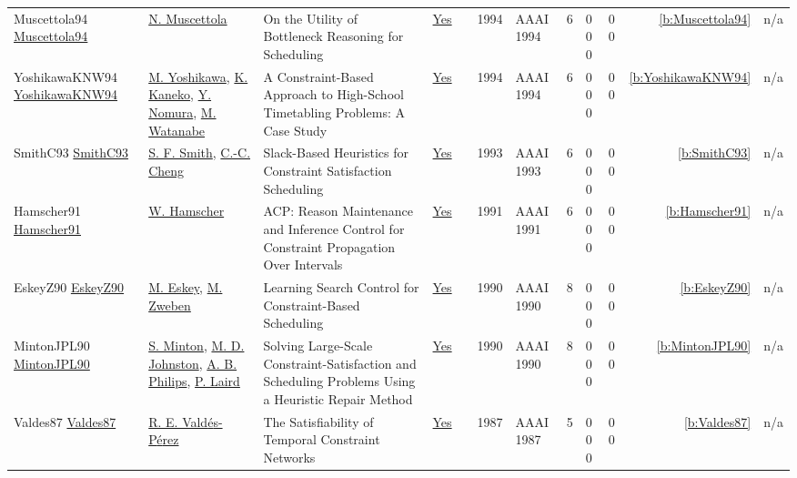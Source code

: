 {\begin{longtable}{>{\raggedright\arraybackslash}p{3cm}>{\raggedright\arraybackslash}p{4.5cm}>{\raggedright\arraybackslash}p{6.0cm}rrrp{2.5cm}rp{1cm}p{1cm}rr}
Muscettola94 \href{http://www.aaai.org/Library/AAAI/1994/aaai94-170.php}{Muscettola94} & \hyperref[auth:a289]{N. Muscettola} & On the Utility of Bottleneck Reasoning for Scheduling & \href{../works/Muscettola94.pdf}{Yes} & \cite{Muscettola94} & 1994 & AAAI 1994 & 6 & 0 0 0 & 0 0 & \ref{b:Muscettola94} & n/a\\
YoshikawaKNW94 \href{http://www.aaai.org/Library/AAAI/1994/aaai94-171.php}{YoshikawaKNW94} & \hyperref[auth:a1280]{M. Yoshikawa}, \hyperref[auth:a1281]{K. Kaneko}, \hyperref[auth:a1282]{Y. Nomura}, \hyperref[auth:a1283]{M. Watanabe} & A Constraint-Based Approach to High-School Timetabling Problems: {A} Case Study & \href{../works/YoshikawaKNW94.pdf}{Yes} & \cite{YoshikawaKNW94} & 1994 & AAAI 1994 & 6 & 0 0 0 & 0 0 & \ref{b:YoshikawaKNW94} & n/a\\
SmithC93 \href{http://www.aaai.org/Library/AAAI/1993/aaai93-022.php}{SmithC93} & \hyperref[auth:a298]{S. F. Smith}, \hyperref[auth:a1277]{C.-C. Cheng} & Slack-Based Heuristics for Constraint Satisfaction Scheduling & \href{../works/SmithC93.pdf}{Yes} & \cite{SmithC93} & 1993 & AAAI 1993 & 6 & 0 0 0 & 0 0 & \ref{b:SmithC93} & n/a\\
Hamscher91 \href{http://www.aaai.org/Library/AAAI/1991/aaai91-079.php}{Hamscher91} & \hyperref[auth:a1276]{W. Hamscher} & {ACP:} Reason Maintenance and Inference Control for Constraint Propagation Over Intervals & \href{../works/Hamscher91.pdf}{Yes} & \cite{Hamscher91} & 1991 & AAAI 1991 & 6 & 0 0 0 & 0 0 & \ref{b:Hamscher91} & n/a\\
EskeyZ90 \href{http://www.aaai.org/Library/AAAI/1990/aaai90-136.php}{EskeyZ90} & \hyperref[auth:a1274]{M. Eskey}, \hyperref[auth:a1275]{M. Zweben} & Learning Search Control for Constraint-Based Scheduling & \href{../works/EskeyZ90.pdf}{Yes} & \cite{EskeyZ90} & 1990 & AAAI 1990 & 8 & 0 0 0 & 0 0 & \ref{b:EskeyZ90} & n/a\\
MintonJPL90 \href{http://www.aaai.org/Library/AAAI/1990/aaai90-003.php}{MintonJPL90} & \hyperref[auth:a1211]{S. Minton}, \hyperref[auth:a1212]{M. D. Johnston}, \hyperref[auth:a1213]{A. B. Philips}, \hyperref[auth:a1214]{P. Laird} & Solving Large-Scale Constraint-Satisfaction and Scheduling Problems Using a Heuristic Repair Method & \href{../works/MintonJPL90.pdf}{Yes} & \cite{MintonJPL90} & 1990 & AAAI 1990 & 8 & 0 0 0 & 0 0 & \ref{b:MintonJPL90} & n/a\\
Valdes87 \href{http://www.aaai.org/Library/AAAI/1987/aaai87-046.php}{Valdes87} & \hyperref[auth:a1273]{R. E. Vald{\'{e}}s-P{\'{e}}rez} & The Satisfiability of Temporal Constraint Networks & \href{../works/Valdes87.pdf}{Yes} & \cite{Valdes87} & 1987 & AAAI 1987 & 5 & 0 0 0 & 0 0 & \ref{b:Valdes87} & n/a\\

\end{longtable}}
